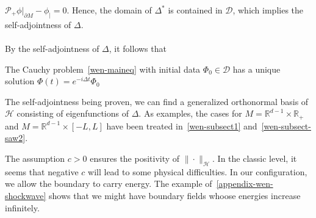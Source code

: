 $\mathcal{P}_+\phi\vert_{\partial M} - \phi_| = 0$.
Hence, the domain of $\Delta^*$ is contained in $\mathcal{D}$, which implies the self-adjointness of $\Delta$.\\\\
By the self-adjointness of $\Delta$, it follows that 
\begin{proposition}\label{wen-propwellposedness}
The Cauchy problem~\cref{wen-maineq} with initial data $\Phi_0\in\mathcal{D}$ has a unique solution $\Phi(t) = e^{-i\Delta t}\Phi_0 $
\end{proposition}
The self-adjointness being proven, 
we can find a generalized orthonormal basis of $\mathcal{H}$ consisting of eigenfunctions of $\Delta$.
As examples, the cases for $M = \mathbb{R}^{d-1}\times\mathbb{R}_+$ and $M = \mathbb{R}^{d-1}\times [-L, L]$ have been treated in~\cref{wen-subsect1} and~\cref{wen-subsect-saw2}.
\begin{remark}
The assumption $c>0$ ensures the positivity of $\|\cdot\|_\mathcal{H}$. 
In the classic level, it seems that negative $c$ will lead to some physical difficulties. 
In our configuration, we allow the boundary to carry energy.
The example of~\cref{appendix-wen-shockwave} shows that we might have boundary fields whoose energies increase infinitely.
\end{remark}
